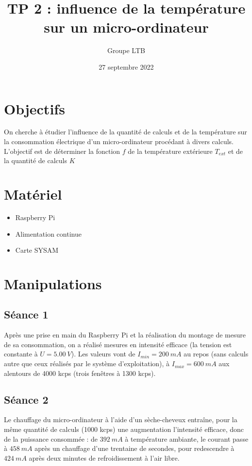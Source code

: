 \documentclass[french]{article}
\title{TP 2 : influence de la température\\
sur un micro-ordinateur}
\author{Groupe LTB}
\date{27 septembre 2022}
\begin{document}
\maketitle

\section{Objectifs}

On cherche à étudier l'influence de la quantité de calculs et de la température sur la consommation électrique d'un micro-ordinateur procédant à divers calculs. L'objectif est de déterminer la fonction $f$ de la température extérieure $T_{ext}$ et de la quantité de calculs $K$  

\section{Matériel}

\begin{itemize}
    \item Raspberry Pi
    \item Alimentation continue
    \item Carte SYSAM
\end{itemize}

\section{Manipulations}

\subsection{Séance 1}

Après une prise en main du Raspberry Pi et la réalisation du montage de mesure de sa consommation, on a réalisé mesures en intensité efficace (la tension est constante à $U = \SI{5,00}{V}$). Les valeurs vont de $I_{min} = \SI{200}{mA}$ au repos (sans calculs autre que ceux réalisés par le système d'exploitation), à $I_{max} = \SI{600}{mA}$ aux alentours de 4000 kcps (trois fenêtres à 1300 kcps).

\subsection{Séance 2}

Le chauffage du micro-ordinateur à l'aide d'un sèche-cheveux entraîne, pour la même quantité de calculs (1000 kcps) une augmentation l'intensité efficace, donc de la puissance consommée : de $\SI{392}{mA}$ à température ambiante, le courant passe à $\SI{458}{mA}$ après un chauffage d'une trentaine de secondes, pour redescendre à $\SI{424}{mA}$ après deux minutes de refroidissement à l'air libre.
\end{document}
